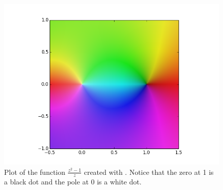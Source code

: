\begin{figure}
\includegraphics[width=\textwidth]{example.png}
\caption{Plot of the function $\frac{z^2 - 1}{z}$ created with .
Notice that the zero at 1 is a black dot and the pole at 0 is a white dot.}
\label{fig:example}
\end{figure}

